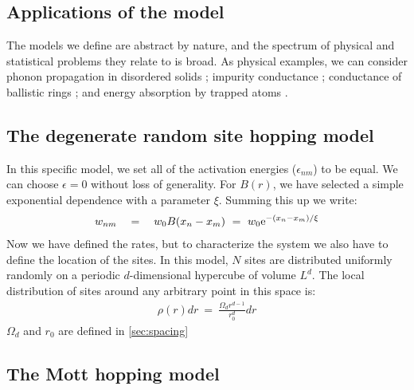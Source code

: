 \subsection{Applications of the model}


The models we define are abstract by nature, and
the spectrum of physical and statistical problems they
relate to is broad.
As physical examples, we can consider
phonon propagation in disordered solids 
\cite{nagel_normal-mode_1981,schirmacher_analogies_1992,amir_localization_2010,amir_mean-field_2008};
impurity conductance \cite{miller_impurity_1960,movaghar_theory_1981};
conductance of ballistic rings \cite{bandopadhyay_conductance_2006,*cohen_kubo_2007,*stotland_random-matrix_2010};
and energy absorption by trapped atoms \cite{stotland_semilinear_2009,*stotland_quantum_2010,*stotland_weak_2011}. 


\subsection{The degenerate random site hopping model} \label{sec:degenerate_random_hopping}

In this specific model, we set all of the activation energies ($\epsilon_{nm}$)
to be equal. We can choose $\epsilon=0$ without loss of generality. For $B(r)$, 
we have selected a simple exponential dependence with a parameter $\xi$.
Summing this up we write:
%
\begin{align}\label{eq:random_hopping_rates}
w_{nm} \quad = \quad w_0 B(x_n-x_m) \ = \ w_0 \mbox{e}^{-(x_n-x_m)/\xi}
\end{align}
%
Now we have defined the rates, but to characterize the system we also
have to define the location of the sites. In this model, $N$ sites are distributed
uniformly randomly on a periodic $d$-dimensional hypercube of volume $L^d$. The
local distribution of sites around any arbitrary point in this space is:
%
\begin{align}\label{eq:site_distribution}
\rho(r)dr \ =\ \frac{\Omega_d r^{d-1}}{r_0^d} dr
\end{align}
%
$\Omega_d$ and $r_0$ are defined in \autoref{sec:spacing}

\subsection{The Mott hopping model}\label{sec:mott_hopping}

